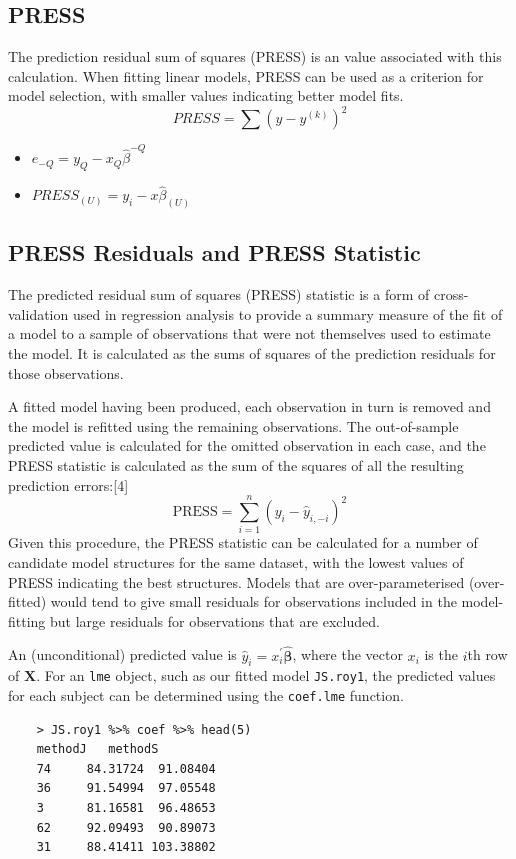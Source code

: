 \documentclass[12pt, a4paper]{report}
\theoremstyle{plain}
\theoremstyle{definition}
\theoremstyle{remark}
\begin{document}
\subsection{PRESS} %
The prediction residual sum of squares (PRESS) is an value associated with this calculation. When fitting linear models, PRESS can be used as a criterion for model selection, with smaller values indicating better model fits.
\begin{equation}
PRESS = \sum(y-y^{(k)})^2
\end{equation}


\begin{itemize}
	\item $e_{-Q} = y_{Q} - x_{Q}\hat{\beta}^{-Q}$
	\item $PRESS_{(U)} = y_{i} - x\hat{\beta}_{(U)}$
\end{itemize}




\subsection{PRESS Residuals and PRESS Statistic}
The predicted residual sum of squares (PRESS) statistic is a form of cross-validation used in regression analysis to provide a summary measure of the fit of a model to a sample of observations that were not themselves used to estimate the model. It is calculated as the sums of squares of the prediction residuals for those observations.

A fitted model having been produced, each observation in turn is removed and the model is refitted using the remaining observations. The out-of-sample predicted value is calculated for the omitted observation in each case, and the PRESS statistic is calculated as the sum of the squares of all the resulting prediction errors:[4]
\[\mbox{PRESS} =\sum_{i=1}^n (y_i - \hat{y}_{i, -i})^2 \]
Given this procedure, the PRESS statistic can be calculated for a number of candidate model structures for the same dataset, with the lowest values of PRESS indicating the best structures. Models that are over-parameterised (over-fitted) would tend to give small residuals for observations included in the model-fitting but large residuals for observations that are excluded.

An (unconditional) predicted value is $\hat{y}_i = x^{\prime}_i \boldsymbol{\hat{\beta}}$, where 
the vector $x_i$ is the $i$th row of $\boldsymbol{X}$. For an \texttt{lme} object, such as our fitted model \texttt{JS.roy1}, the predicted values for each subject can be determined using the \texttt{coef.lme} function.
\begin{framed}
	\begin{verbatim}
	> JS.roy1 %>% coef %>% head(5)
	methodJ   methodS
	74     84.31724  91.08404
	36     91.54994  97.05548
	3      81.16581  96.48653
	62     92.09493  90.89073
	31     88.41411 103.38802
	\end{verbatim}
\end{framed}
\end{document}
